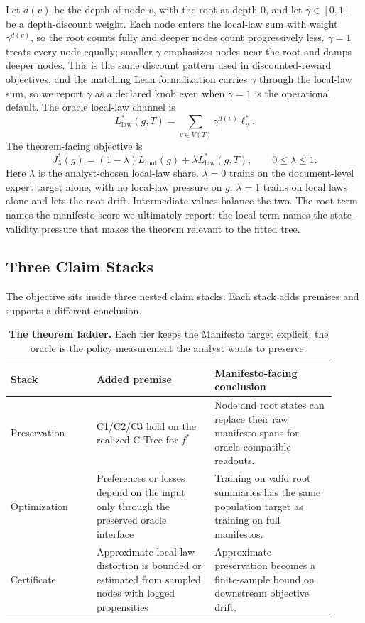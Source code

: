 Let \(d(v)\) be the depth of node \(v\), with the root at depth \(0\),
and let \(\gamma\in[0,1]\) be a depth-discount weight. Each node enters
the local-law sum with weight \(\gamma^{d(v)}\), so the root counts
fully and deeper nodes count progressively less. \(\gamma=1\) treats
every node equally; smaller \(\gamma\) emphasizes nodes near the root
and damps deeper nodes. This is the same discount pattern used in
discounted-reward objectives, and the matching Lean formalization
carries \(\gamma\) through the local-law sum, so we report \(\gamma\)
as a declared knob even when \(\gamma=1\) is the operational default.
The oracle local-law channel is
\begin{equation}
\label{eq:v8-local-law-estimand}
  L_{\mathrm{law}}^\ast(g,T)
  =
  \sum_{v\in V(T)}\gamma^{d(v)}\ell_v^\ast .
\end{equation}
The theorem-facing objective is
\begin{equation}
\label{eq:v8-main-objective}
  J_\lambda^\ast(g)
  =
  (1-\lambda)L_{\mathrm{root}}(g)
  +
  \lambda L_{\mathrm{law}}^\ast(g,T),
  \qquad 0\le\lambda\le 1 .
\end{equation}
Here \(\lambda\) is the analyst-chosen local-law share. \(\lambda=0\)
trains on the document-level expert target alone, with no local-law
pressure on \(g\). \(\lambda=1\) trains on local laws alone and lets
the root drift. Intermediate values balance the two. The root term
names the manifesto score we ultimately report; the local term names
the state-validity pressure that makes the theorem relevant to the
fitted tree.

\subsection{Three Claim Stacks}

The objective sits inside three nested claim stacks. Each stack adds premises
and supports a different conclusion.

\begin{table}[t]
\centering
\small
\begin{tabular}{@{}p{0.24\linewidth}p{0.33\linewidth}p{0.34\linewidth}@{}}
\toprule
Stack & Added premise & Manifesto-facing conclusion \\
\midrule
Preservation & C1/C2/C3 hold on the realized C-Tree for \(f^\ast\) &
Node and root states can replace their raw manifesto spans for
oracle-compatible readouts. \\
Optimization & Preferences or losses depend on the input only through the
preserved oracle interface &
Training on valid root summaries has the same population target as training
on full manifestos. \\
Certificate & Approximate local-law distortion is bounded or estimated from
sampled nodes with logged propensities &
Approximate preservation becomes a finite-sample bound on downstream
objective drift. \\
\bottomrule
\end{tabular}
\caption{\textbf{The theorem ladder.} Each tier keeps the Manifesto target
explicit: the oracle is the policy measurement the analyst wants to preserve.}
\label{tab:v8-theorem-ladder}
\end{table}

